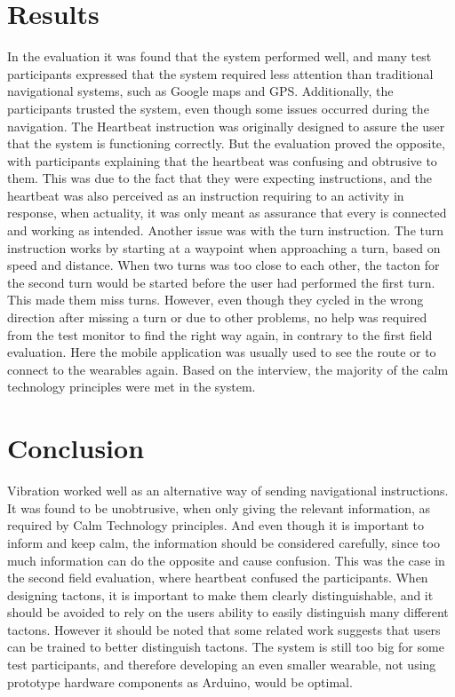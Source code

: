 \documentclass{sigchi}
\begin{document}
\section{Results}
In the evaluation it was found that the system performed well, and many test participants expressed that the system required less attention than traditional navigational systems, such as Google maps and GPS. 
\newline
\newline
Additionally, the participants trusted the system, even though some issues occurred during the navigation. The Heartbeat instruction was originally designed to assure the user that the system is functioning correctly. But the evaluation proved the opposite, with participants explaining that the heartbeat was confusing and obtrusive to them. This was due to the fact that they were expecting instructions, and the heartbeat was also perceived as an instruction requiring to an activity in response, when actuality, it was only meant as assurance that every is connected and working as intended.
\newline
Another issue was with the turn instruction. The turn instruction works by starting at a waypoint when approaching a turn, based on speed and distance. When two turns was too close to each other, the tacton for the second turn would be started before the user had performed the first turn. This made them miss turns.
\newline
\newline 
However, even though they cycled in the wrong direction after missing a turn or due to other problems, no help was required from the test monitor to find the right way again, in contrary to the first field evaluation. Here the mobile application was usually used to see the route or to connect to the wearables again. 
\newline
Based on the interview, the majority of the calm technology principles were met in the system. 

\section{Conclusion}
Vibration worked well as an alternative way of sending navigational instructions. It was found to be unobtrusive, when only giving the relevant information, as required by Calm Technology principles. 
And even though it is important to inform and keep calm, the information should be considered carefully, since too much information can do the opposite and cause confusion. This was the case in the second field evaluation, where heartbeat confused the participants. When designing tactons, it is important to make them clearly distinguishable, and it should be avoided to rely on the users ability to easily distinguish many different tactons. However it should be noted that some related work suggests that users can be trained to better distinguish tactons. 
\newline
The system is still too big for some test participants, and therefore developing an even smaller wearable, not using prototype hardware components as Arduino, would be optimal. 
\end{document}
